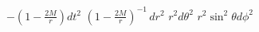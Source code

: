 
$-(1 - \frac{2M}{r}) dt^2$
$(1 - \frac{2M}{r})^{-1}\,dr^2$
$r^2 d\theta^2$
$r^2\sin^2\theta d\phi^2$
